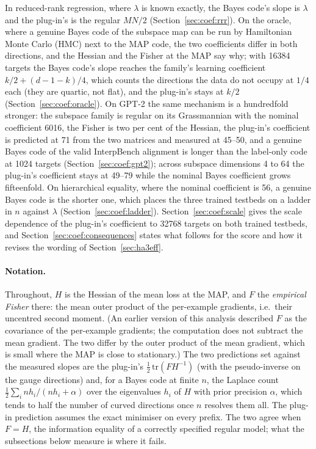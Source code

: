 \documentclass[11pt,a4paper]{article}
\begin{document}
In reduced-rank regression, where $\lambda$ is known exactly, the Bayes code's slope is $\lambda$ and the plug-in's is the regular $MN/2$ (Section~\ref{sec:coef:rrr}). On the oracle, where a genuine Bayes code of the subspace map can be run by Hamiltonian Monte Carlo (HMC) next to the MAP code, the two coefficients differ in both directions, and the Hessian and the Fisher at the MAP say why; with 16384 targets the Bayes code's slope reaches the family's learning coefficient $k/2+(d-1-k)/4$, which counts the directions the data do not occupy at $1/4$ each (they are quartic, not flat), and the plug-in's stays at $k/2$ (Section~\ref{sec:coef:oracle}). On GPT-2 the same mechanism is a hundredfold stronger: the subspace family is regular on its Grassmannian with the nominal coefficient 6016, the Fisher is two per cent of the Hessian, the plug-in's coefficient is predicted at 71 from the two matrices and measured at 45--50, and a genuine Bayes code of the valid InterpBench alignment is longer than the label-only code at 1024 targets (Section~\ref{sec:coef:gpt2}); across subspace dimensions 4 to 64 the plug-in's coefficient stays at 49--79 while the nominal Bayes coefficient grows fifteenfold. On hierarchical equality, where the nominal coefficient is 56, a genuine Bayes code is the shorter one, which places the three trained testbeds on a ladder in $n$ against $\lambda$ (Section~\ref{sec:coef:ladder}). Section~\ref{sec:coef:scale} gives the scale dependence of the plug-in's coefficient to 32768 targets on both trained testbeds, and Section~\ref{sec:coef:consequences} states what follows for the score and how it revises the wording of Section~\ref{sec:ha3eff}.

\paragraph{Notation.} Throughout, $H$ is the Hessian of the mean loss at the MAP, and $F$ the \emph{empirical Fisher} there: the mean outer product of the per-example gradients, i.e.\ their uncentred second moment. (An earlier version of this analysis described $F$ as the covariance of the per-example gradients; the computation does not subtract the mean gradient. The two differ by the outer product of the mean gradient, which is small where the MAP is close to stationary.) The two predictions set against the measured slopes are the plug-in's $\tfrac12\,\mathrm{tr}(FH^{-1})$ (with the pseudo-inverse on the gauge directions) and, for a Bayes code at finite $n$, the Laplace count $\tfrac12\sum_i n h_i/(n h_i+\alpha)$ over the eigenvalues $h_i$ of $H$ with prior precision $\alpha$, which tends to half the number of curved directions once $n$ resolves them all. The plug-in prediction assumes the exact minimiser on every prefix. The two agree when $F=H$, the information equality of a correctly specified regular model; what the subsections below measure is where it fails.
\end{document}
